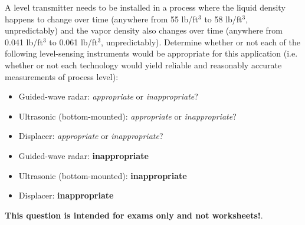 

A level transmitter needs to be installed in a process where the liquid density happens to change over time (anywhere from 55 lb/ft$^{3}$ to 58 lb/ft$^{3}$, unpredictably) and the vapor density also changes over time (anywhere from 0.041 lb/ft$^{3}$ to 0.061 lb/ft$^{3}$, unpredictably).  Determine whether or not each of the following level-sensing instruments would be appropriate for this application (i.e. whether or not each technology would yield reliable and reasonably accurate measurements of process level):

\begin{itemize}
\item{} Guided-wave radar: {\it appropriate} or {\it inappropriate}?
\vskip 10pt
\item{} Ultrasonic (bottom-mounted): {\it appropriate} or {\it inappropriate}?
\vskip 10pt
\item{} Displacer: {\it appropriate} or {\it inappropriate}?
\end{itemize}







\begin{itemize}
\item{} Guided-wave radar: {\bf inappropriate}
\vskip 10pt
\item{} Ultrasonic (bottom-mounted): {\bf inappropriate}
\vskip 10pt
\item{} Displacer: {\bf inappropriate}
\end{itemize}







{\bf This question is intended for exams only and not worksheets!}.



